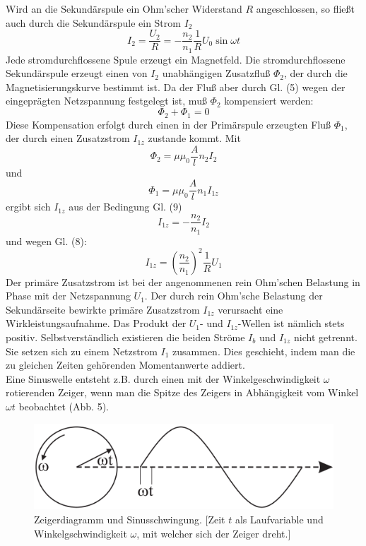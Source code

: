 \documentclass[12pt,a4paper,twoside]{article}
\theoremstyle{definition}
\begin{document}
Wird an die Sekundärspule ein Ohm’scher Widerstand $R$ angeschlossen, so fließt auch durch die Sekundärspule ein Strom $I_2$
\begin{equation}
    I_2 = \frac{U_2}{R} = - \frac{n_2}{n_1} \frac{1}{R} U_0 \sin \omega t
\end{equation}
Jede stromdurchflossene Spule erzeugt ein Magnetfeld. Die stromdurchflossene Sekundärspule erzeugt einen von $I_2$ unabhängigen Zusatzfluß $\Phi_2$, der durch die Magnetisierungskurve bestimmt ist. Da der Fluß aber durch Gl. (5) wegen der eingeprägten Netzspannung festgelegt ist, muß $\Phi_2$ kompensiert werden:
\begin{equation}
    \Phi_2 + \Phi_1 = 0
\end{equation}
Diese Kompensation erfolgt durch einen in der Primärspule erzeugten Fluß $\Phi_1$, der durch einen Zusatzstrom $I_{1z}$ zustande kommt. Mit
\begin{equation}
    \Phi_2 = \mu \mu_0 \frac{A}{l} n_2 I_2
\end{equation}
und
\begin{equation}
    \Phi_1 = \mu \mu_0 \frac{A}{l} n_1 I_{1z}
\end{equation}
ergibt sich $I_{1z}$ aus der Bedingung Gl. (9)
\begin{equation}
    I_{1z} = - \frac{n_2}{n_1} I_2
\end{equation}
und wegen Gl. (8):
\begin{equation}
    I_{1z} = \left( \frac{n_2}{n_1} \right)^2 \frac{1}{R} U_1
\end{equation}
Der primäre Zusatzstrom ist bei der angenommenen rein Ohm’schen Belastung in Phase mit der Netzspannung $U_1$. Der durch rein Ohm’sche Belastung der Sekundärseite bewirkte primäre Zusatzstrom $I_{1z}$ verursacht eine Wirkleistungsaufnahme. Das Produkt der $U_1$- und $I_{1z}$-Wellen ist nämlich stets positiv. Selbstverständlich existieren die beiden Ströme $I_b$ und $I_{1z}$ nicht getrennt. Sie setzen sich zu einem Netzstrom $I_1$ zusammen. Dies geschieht, indem man die zu gleichen Zeiten gehörenden Momentanwerte addiert. \\
Eine Sinuswelle entsteht z.B. durch einen mit der Winkelgeschwindigkeit $\omega$ rotierenden Zeiger, wenn man die Spitze des Zeigers in Abhängigkeit vom Winkel $\omega t$ beobachtet (Abb. 5).
\begin{figure}[H]
    \centering
    \includegraphics[width=\linewidth/2]{grundlagen/abb5}
    \caption{Zeigerdiagramm und Sinusschwingung. [Zeit $t$ als Laufvariable und Winkelgschwindigkeit $\omega$, mit welcher sich der Zeiger dreht.]}
\end{figure}
\end{document}

